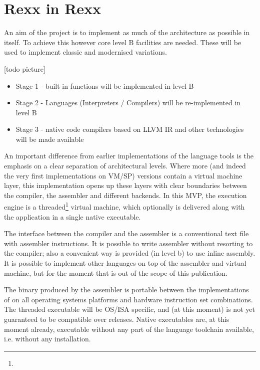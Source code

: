\section{Rexx in Rexx}
An aim of the project is to implement as much of the \crexx{} architecture as possible in \rexx{} itself. To achieve this however core \rexx{} level B facilities are needed. These will be used to implement classic \rexx{} and modernised \rexx{} variations. 

[todo picture]
\begin{itemize}
\item Stage 1 - \rexx{} built-in functions will be implemented in \crexx{} level B
\item Stage 2 - \rexx{} Languages (Interpreters / Compilers) will be re-implemented in \crexx{} level B
\item Stage 3 - native code compilers based on LLVM IR and other technologies will be made available
\end{itemize}

An important difference from earlier implementations of the language tools is the emphasis on a clear separation of architectural levels. Where more (and indeed the very first implementations on VM/SP) versions contain a virtual machine layer, this implementation opens up these layers with clear boundaries between the compiler, the assembler and different backends. In this MVP, the execution engine is a threaded\footnote{} virtual machine, which optionally is delivered along with the application in a single native executable.

The interface between the compiler and the assembler is a conventional text file with \crexx{} assembler instructions. It is possible to write \crexx{} assembler without resorting to the compiler; also a convenient way is provided (in \crexx{} level b) to use inline assembly. It is possible to implement other languages on top of the assembler and virtual machine, but for the moment that is out of the scope of this publication.

The binary produced by the assembler is portable between the implementations of \crexx{} on all operating systems platforms and hardware instruction set combinations. The threaded executable will be OS/ISA specific, and (at this moment) is not yet guaranteed to be compatible over \crexx{} releases. Native executables are, at this moment already, executable without any part of the language toolchain available, i.e. without any installation.

